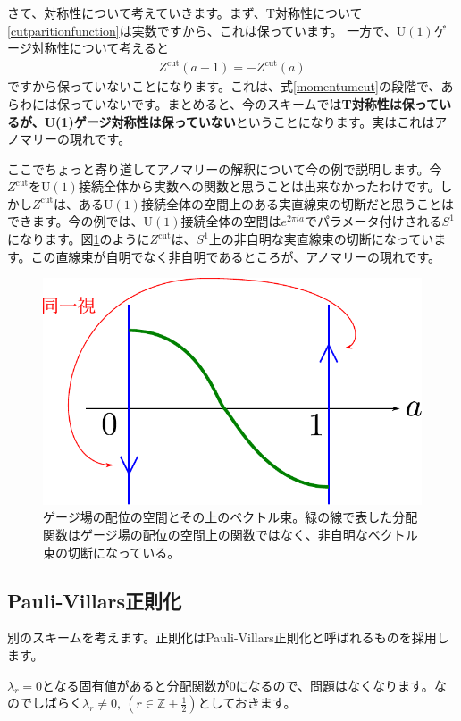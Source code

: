 \documentclass[paper=a4, fontsize=12pt, line_length=16cm, number_of_lines=33,dvipdfmx]{jlreq}
\numberwithin{equation}{section}
\newcommand{\Zb}{\mathbb{Z}}
\newcommand{\strong}[1]{\textsf{\bfseries #1}}
\newcommand{\halfint}{\Zb+\frac{1}{2}}
\newcommand{\U}{\mathrm{U}}
\newcommand{\Zcut}{Z^{\mathrm{cut}}}
\begin{document}
さて、対称性について考えていきます。まず、T対称性について\eqref{cutparitionfunction}は実数ですから、これは保っています。
一方で、$\U(1)$ゲージ対称性について考えると
\begin{align}
  \Zcut(a+1)=-\Zcut(a)
\end{align}
ですから保っていないことになります。これは、式\eqref{momentumcut}の段階で、あらわには保っていないです。まとめると、今のスキームでは\strong{T対称性は保っているが、U(1)ゲージ対称性は保っていない}ということになります。実はこれはアノマリーの現れです。

ここでちょっと寄り道してアノマリーの解釈について今の例で説明します。今$\Zcut$を$\U(1)$接続全体から実数への関数と思うことは出来なかったわけです。しかし$\Zcut$は、ある$\U(1)$接続全体の空間上のある実直線束の切断だと思うことはできます。今の例では、$\U(1)$接続全体の空間は$e^{2\pi ia}$でパラメータ付けされる$S^1$になります。図\ref{fig:configspace}のように$\Zcut$は、$S^1$上の非自明な実直線束の切断になっています。この直線束が自明でなく非自明であるところが、アノマリーの現れです。
\begin{figure}[htbp]
  \centering
  \includegraphics{configspace.pdf}
  \caption{ゲージ場の配位の空間とその上のベクトル束。緑の線で表した分配関数はゲージ場の配位の空間上の関数ではなく、非自明なベクトル束の切断になっている。}
  \label{fig:configspace}
\end{figure}

\subsection{Pauli-Villars正則化}
別のスキームを考えます。正則化はPauli-Villars正則化と呼ばれるものを採用します。

$\lambda_r=0$となる固有値があると分配関数が$0$になるので、問題はなくなります。なのでしばらく$\lambda_r\ne 0,\ (r\in \halfint)$としておきます。
\end{document}
